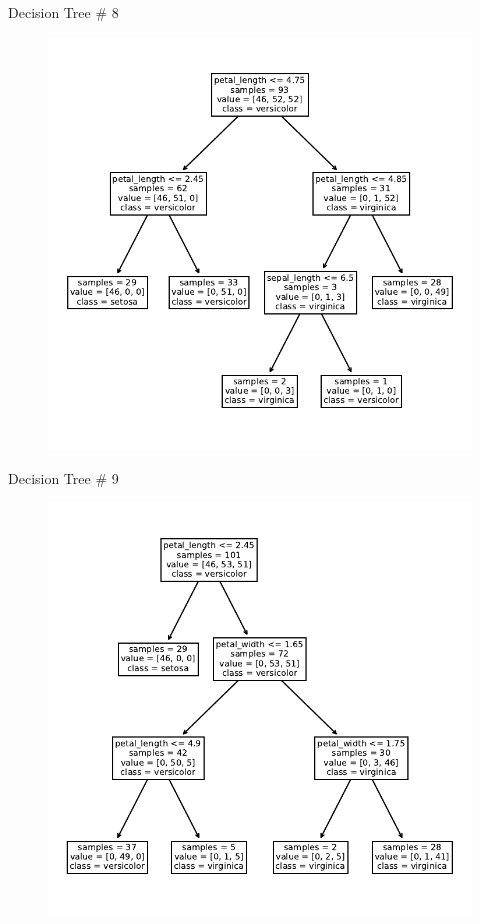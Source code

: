 \documentclass{beamer}
\begin{document}
\begin{frame}{Decision Tree \# 8}
\begin{figure}
\includegraphics[scale=0.7]{tree-8.pdf}
\end{figure}
\end{frame}


\begin{frame}{Decision Tree \# 9}
\begin{figure}
\includegraphics[scale=0.7]{tree-9.pdf}
\end{figure}
\end{frame}
\end{document}
